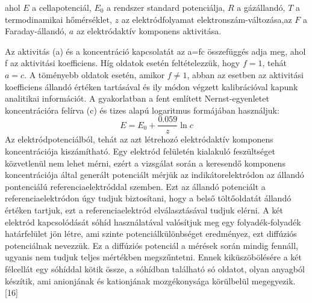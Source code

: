 ahol $E$ a cellapotenciál, $E_\text{0}$ a rendszer standard potenciálja, $R$ a gázállandó, $T$ a termodinamikai hőmérséklet, $z$ az elektródfolyamat elektronszám-változása,az $F$ a Faraday-állandó, $a$ az elektródaktív komponens aktivitása.

Az aktivitás (a) és a koncentráció kapcsolatát az a=fc összefüggés adja meg, ahol f az aktivitási koefficiens. Híg oldatok esetén feltételezzük, hogy $f=1$, tehát $a=c$. A töményebb oldatok esetén, amikor $f\neq 1$, abban az esetben az aktivitási koefficiens állandó értéken tartásával és ily módon végzett kalibrációval kapunk analitikai információt. A gyakorlatban a fent említett Nernst-egyenletet koncentrációra felírva (c) és tizes alapú logaritmus formájában használjuk:
\begin{equation}
E= E_\text{0} + \frac{0.059}{z} \ln c
\end{equation}
Az elektródpotenciálból, tehát az azt létrehozó elektródaktív komponens koncentrációja kiszámítható. Egy elektród felületén kialakuló feszültséget közvetlenül nem lehet mérni, ezért a vizsgálat során a keresendő komponens koncentrációja által generált potenciált mérjük az indikátorelektródon az állandó pontenciálú referenciaelektróddal szemben. Ezt az állandó potenciált a referenciaelektródon úgy tudjuk biztosítani, hogy a belső töltőoldatát állandó értéken tartjuk, ezt a referenciaelektród elválasztásával tudjuk elérni. A két elektród kapcsolódását sóhíd használatával valósítjuk meg egy folyadék-folyadék határfelület jön létre, ami szinte potenciálkülönbséget eredményez, ezt diffúziós potenciálnak nevezzük. Ez a diffúziós potenciál a mérések során mindig fennáll, ugyanis nem tudjuk teljes mértékben megszűntetni. Ennek kiküszöbölésére a két félcellát egy sóhíddal kötik össze, a sóhídban található só oldatot, olyan anyagból készítik, ami anionjának és kationjának mozgékonysága körülbelül megegyezik. [16]


